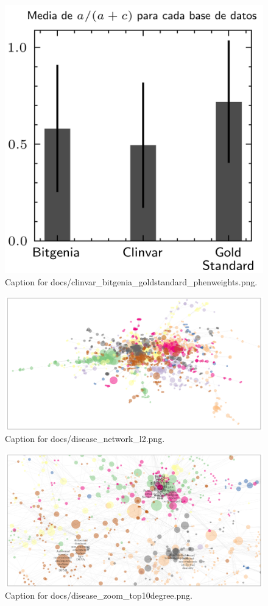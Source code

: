 \documentclass{article}
\begin{document}
\begin{figure}[h] \centering \includegraphics{docs/clinvar_bitgenia_goldstandard_phenweights.png} \caption{Caption for docs/clinvar_bitgenia_goldstandard_phenweights.png.} \end{figure}
\begin{figure}[h] \centering \includegraphics{docs/disease_network_l2.png} \caption{Caption for docs/disease_network_l2.png.} \end{figure}
\begin{figure}[h] \centering \includegraphics{docs/disease_zoom_top10degree.png} \caption{Caption for docs/disease_zoom_top10degree.png.} \end{figure}
\end{document}
